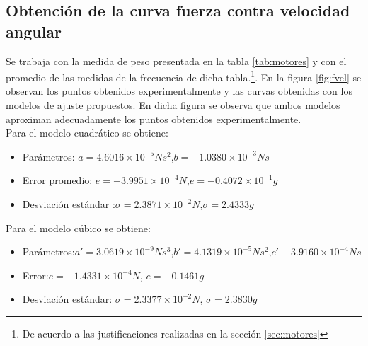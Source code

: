 \documentclass[main]{subfiles}
\begin{document}
\subsection{Obtenci\'on de la curva fuerza contra velocidad angular}

Se trabaja con la medida de peso presentada en la tabla \ref{tab:motores} y con el promedio de las medidas de la frecuencia de dicha tabla.\footnote{De acuerdo a las justificaciones realizadas en la secci\'on \ref{sec:motores}}. En la figura \ref{fig:fvel} se observan los puntos obtenidos experimentalmente y las curvas obtenidas con los modelos de ajuste propuestos. En dicha figura se observa que ambos modelos aproximan adecuadamente los puntos obtenidos experimentalmente.\\

Para el modelo cuadr\'atico se obtiene:
\begin{itemize}
\item Par\'ametros: \newline$a=4.6016\times10^{-5}Ns^2$,\newline$b=-1.0380\times 10^{-3}Ns$
\item Error promedio: \newline$e=-3.9951\times 10 ^{-4}N$,\newline $e=-0.4072\times 10 ^{-1}g$
\item Desviaci\'on est\'andar :\newline$\sigma=2.3871\times10^{-2}N$,\newline $\sigma=2.4333g$
\end{itemize}

Para el modelo c\'ubico se obtiene:
\begin{itemize}
\item Par\'ametros:\newline$a\prime = 3.0619\times 10^{-9}Ns^3$,\newline$b\prime =4.1319\times10^{-5}Ns^2$,\newline$c\prime -3.9160\times10^{-4}Ns$
\item Error:\newline $e =-1.4331\times10^{-4}N$, \newline $e=-0.1461g$
\item Desviaci\'on est\'andar: \newline $\sigma=2.3377\times 10^{-2}N$, \newline $\sigma =2.3830g$
\end{itemize}
\end{document}
